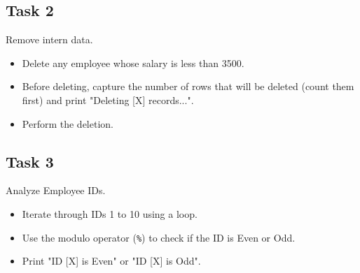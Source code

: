 \documentclass[12pt,a4paper]{article}
\newif\ifshowsolutions
\begin{document}
\subsection*{Task 2}
Remove intern data.
\begin{itemize}
    \item Delete any employee whose salary is less than 3500.
    \item Before deleting, capture the number of rows that will be deleted (count them first) and print "Deleting [X] records...".
    \item Perform the deletion.
\end{itemize}

\ifshowsolutions
\textbf{Solution:}
\begin{lstlisting}[language=SQL]
DO $$ 
DECLARE
    v_count INT;
BEGIN
    -- 1. Count how many match the criteria
    SELECT COUNT(*) INTO v_count FROM employees WHERE salary < 3500;

    RAISE NOTICE 'Deleting % records...', v_count;

    -- 2. Perform Delete
    DELETE FROM employees WHERE salary < 3500;
    
    RAISE NOTICE 'Deletion Complete.';
END $$;
\end{lstlisting}
\fi

\subsection*{Task 3}
Analyze Employee IDs.
\begin{itemize}
    \item Iterate through IDs 1 to 10 using a loop.
    \item Use the modulo operator (\texttt{\%}) to check if the ID is Even or Odd.
    \item Print "ID [X] is Even" or "ID [X] is Odd".
\end{itemize}

\ifshowsolutions
\textbf{Solution:}
\begin{lstlisting}[language=SQL]
DO $$ 
DECLARE
    v_counter INT := 1;
BEGIN
    WHILE v_counter <= 10 LOOP
        
        IF v_counter % 2 = 0 THEN
            RAISE NOTICE 'ID % is Even', v_counter;
        ELSE
            RAISE NOTICE 'ID % is Odd', v_counter;
        END IF;

        v_counter := v_counter + 1;
    END LOOP;
END $$;
\end{lstlisting}
\fi
\end{document}
